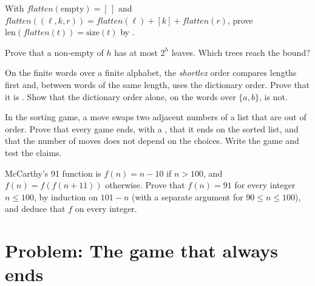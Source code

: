 \begin{exercise}[$\star\star$]\label{exo:b1:induction-and-termination:8}
With $\mathit{flatten}(\text{empty}) = [\,]$ and $\mathit{flatten}((\ell, k, r)) = \mathit{flatten}(\ell) + [k] +
\mathit{flatten}(r)$, prove $\text{len}(\mathit{flatten}(t)) = \text{size}(t)$ by .
\end{exercise}

\begin{exercise}[$\star\star$]\label{exo:b1:induction-and-termination:9}
Prove that a non-empty  of  $h$ has at most $2^h$ leaves. Which trees reach the bound?
\end{exercise}

\begin{exercise}[$\star\star\star$]\label{exo:b1:induction-and-termination:10}
On the finite words over a finite alphabet, the \emph{shortlex} order compares lengths first and, between words of
the same length, uses the dictionary order. Prove that it is . Show that the dictionary order alone, on the
words over $\{a, b\}$, is not.
\end{exercise}

\begin{exercise}[$\star\star\star$]\label{exo:b1:induction-and-termination:11}
In the sorting game, a move swaps two adjacent numbers of a list that are out of order. Prove that every game ends, with
a , that it ends on the sorted list, and that the number of moves does not depend on the choices. Write the
game and test the claims.
\end{exercise}

\begin{exercise}[$\star\star\star$]\label{exo:b1:induction-and-termination:12}
McCarthy's 91 function is $f(n) = n - 10$ if $n > 100$, and $f(n) = f(f(n + 11))$ otherwise. Prove that $f(n) = 91$ for
every integer $n \leq 100$, by  induction on $101 - n$ (with a separate argument for $90 \leq n \leq 100$),
and deduce that $f$  on every integer.
\end{exercise}

\section{Problem: The game that always ends}\label{sec:b1:induction-and-termination:problem}

